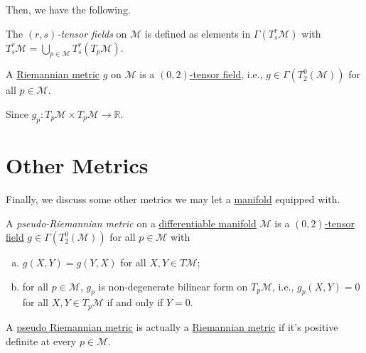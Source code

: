 Then, we have the following.

\begin{definition}\label{def:tensor-field}
	The \emph{\((r, s)\)-tensor fields} on \(\mathcal{M} \) is defined as elements in \(\Gamma (T_s^r \mathcal{M} )\) with \(T_s^r \mathcal{M} = \bigcup_{p\in \mathcal{M} }T^r_s(T_p \mathcal{M} )\).
\end{definition}

\begin{eg}
	A \hyperref[def:Riemannian-metric]{Riemannian metric} \(g\) on \(\mathcal{M} \) is a \hyperref[def:tensor-field]{\((0, 2)\)-tensor field}, i.e., \(g\in \Gamma (T_2^0 (\mathcal{M} ))\) for all \(p \in \mathcal{M} \).
\end{eg}
\begin{explanation}
	Since \(g_p \colon T_p \mathcal{M} \times T_p \mathcal{M} \to \mathbb{R} \).
\end{explanation}

\section{Other Metrics}
Finally, we discuss some other metrics we may let a \hyperref[def:smooth-manifold]{manifold} equipped with.

\begin{definition}\label{def:pseudo-Riemannian-metric}
	A \emph{pseudo-Riemannian metric} on a \hyperref[def:smooth-manifold]{differentiable manifold} \(\mathcal{M} \) is a \hyperref[def:tensor-field]{\((0, 2)\)-tensor field} \(g\in \Gamma (T_2^0 (\mathcal{M}) )\) for all \(p\in \mathcal{M} \) with
	\begin{enumerate}[(a)]
		\item \(g(X, Y) = g(Y, X)\) for all \(X, Y\in T \mathcal{M} \);
		\item for all \(p\in \mathcal{M} \), \(g_p\) is non-degenerate bilinear form on \(T_p \mathcal{M} \), i.e., \(g_p(X, Y) = 0\) for all \(X, Y\in T_p \mathcal{M} \) if and only if \(Y = 0\).
	\end{enumerate}
\end{definition}

\begin{note}
	A \hyperref[def:pseudo-Riemannian-metric]{pseudo Riemannian metric} is actually a \hyperref[def:Riemannian-metric]{Riemannian metric} if it's positive definite at every \(p\in \mathcal{M} \).
\end{note}

